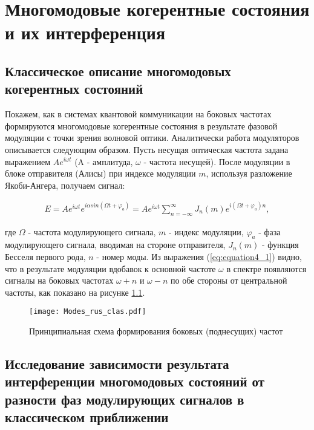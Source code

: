 \chapter{Многомодовые когерентные состояния и их интерференция}  \label{ch:ch4}

\section{Классическое описание многомодовых когерентных состояний} \label{sec:ch4/sec1}

Покажем, как в системах квантовой коммуникации на боковых частотах формируются многомодовые когерентные состояния в результате фазовой модуляции с точки зрения волновой оптики. Аналитически работа модуляторов описывается следующим образом. Пусть несущая оптическая частота задана выражением $Ae^{i \omega t}$ (A - амплитуда, $\omega$ - частота несущей). После модуляции в блоке отправителя (Алисы) при индексе модуляции $m$, используя разложение Якоби-Ангера, получаем сигнал: 

\begin{equation}
	\begin{aligned}
	\label{eq:equation4_1}
		E = Ae^{i \omega t}e^{i \alpha sin(\Omega t+ \varphi_a)} = Ae^{i \omega t} \sum_{n=-\infty}^\infty J_{n}(m) e^{i (\Omega t+ \varphi_a) n},
	\end{aligned}
\end{equation}

где  $\Omega$ - частота модулирующего сигнала, $m$ - индекс модуляции, $\varphi_a$ - фаза модулирующего сигнала, вводимая на стороне отправителя, $J_{n}(m)$ - функция Бесселя первого рода, $n$ - номер моды. Из выражения (\ref{eq:equation4_1}) видно, что в результате модуляции вдобавок к основной частоте $\omega$ в спектре появляются сигналы на боковых частотах  $\omega + n$  и  $\omega - n$ по обе стороны от центральной частоты, как показано на рисунке \ref{fig:multimodes_clas}. 

\begin{figure}[ht]
  \centering
  \texttt{[image: Modes\_rus\_clas.pdf]}
  \caption{Принципиальная схема формирования боковых (поднесущих) частот}
  \label{fig:multimodes_clas}
\end{figure}

\section{Исследование зависимости результата интерференции многомодовых состояний от разности фаз модулирующих сигналов в классическом приближении} \label{sec:ch4/sec2}

